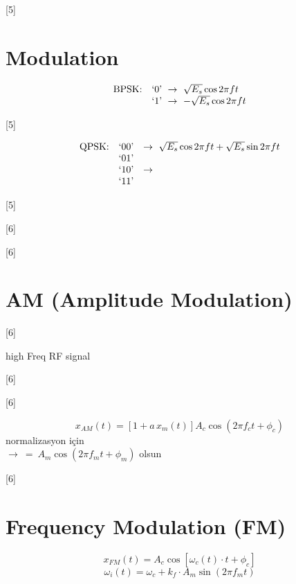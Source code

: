 \documentclass[11pt,a4paper]{article}
\begin{document}
[5]

\section{Modulation}
\[
\begin{array}{@{}l@{\quad}l@{}}
\text{BPSK:} & \text{`0'}\ \rightarrow\ \sqrt{E_s}\cos 2\pi f t\\
 & \text{`1'}\ \rightarrow\ -\sqrt{E_s}\cos 2\pi f t
\end{array}
\]

[5]

\[
\begin{array}{@{}l@{\quad}l@{\quad}l@{}}
\text{QPSK:} & \text{`00'} & \rightarrow\ \sqrt{E_s}\cos 2\pi f t + \sqrt{E_s}\sin 2\pi f t\\
 & \text{`01'} & \\
 & \text{`10'} & \rightarrow\\
 & \text{`11'} &
\end{array}
\]

[5]

[6]

[6]

\section{AM (Amplitude Modulation)}
[6]

high Freq RF signal

[6]

[6]

\[ x_{AM}(t) = \left[1 + a\,x_m(t)\right] A_c \cos\left(2\pi f_c t + \phi_c\right) \]
normalizasyon için \\
$\rightarrow\ {=}\ A_m\cos(2\pi f_m t + \phi_m)$ olsun

[6]

\section{Frequency Modulation (FM)}
\[ x_{FM}(t) = A_c\cos\left[\omega_c(t)\cdot t + \phi_c\right] \]
\[ \omega_i(t) = \omega_c + k_f\cdot A_m\sin(2\pi f_m t) \]
\end{document}
